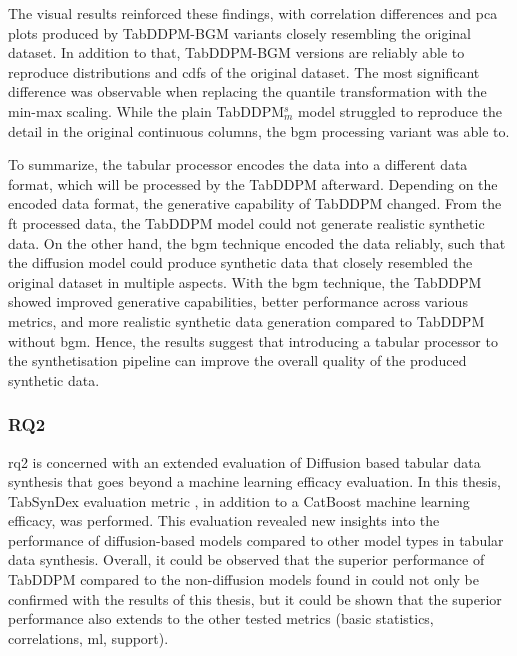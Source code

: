 The visual results reinforced these findings, with correlation differences and \gls{pca} plots produced by TabDDPM-BGM variants closely resembling the original dataset.
In addition to that, TabDDPM-BGM versions are reliably able to reproduce distributions and \glspl{cdf} of the original dataset.
The most significant difference was observable when replacing the quantile transformation with the min-max scaling.
While the plain TabDDPM$^s_m$ model struggled to reproduce the detail in the original continuous columns, the \gls{bgm} processing variant was able to.

To summarize, the tabular processor encodes the data into a different data format, which will be processed by the TabDDPM afterward.
Depending on the encoded data format, the generative capability of TabDDPM changed.
From the \gls{ft} processed data, the TabDDPM model could not generate realistic synthetic data.
On the other hand, the \gls{bgm} technique encoded the data reliably, such that the diffusion model could produce synthetic data that closely resembled the original dataset in multiple aspects.
With the \gls{bgm} technique, the TabDDPM showed improved generative capabilities, better performance across various metrics, and more realistic synthetic data generation compared to TabDDPM without \gls{bgm}.
Hence, the results suggest that introducing a tabular processor to the synthetisation pipeline can improve the overall quality of the produced synthetic data.


\subsubsection{RQ2}
\gls{rq}2 is concerned with an extended evaluation of Diffusion based tabular data synthesis that goes beyond a machine learning efficacy evaluation.
In this thesis, TabSynDex evaluation metric \cite{chundawat2022UniversalMetricRobust}, in addition to a CatBoost machine learning efficacy, was performed.
This evaluation revealed new insights into the performance of diffusion-based models compared to other model types in tabular data synthesis.
Overall, it could be observed that the superior performance of TabDDPM compared to the non-diffusion models found in \cite{kotelnikov2022TabDDPMModellingTabular}
could not only be confirmed with the results of this thesis, but it could be shown that the superior performance also extends to the other tested metrics (basic statistics, correlations, ml, support).

